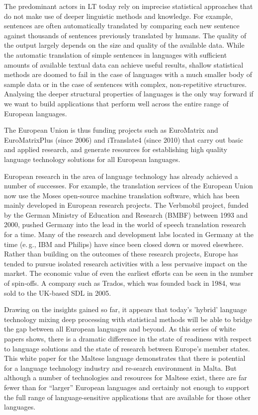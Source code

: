 \documentclass[]{../../metanetpaper}
\begin{document}
\begin{multicols}{2}
The predominant actors in LT today rely on imprecise statistical approaches that do not make use of deeper linguistic methods and knowledge. For example, sentences are often automatically translated by comparing each new sentence against thousands of sentences previously translated by humans. The quality of the output largely depends on the size and quality of the available  data. While the automatic translation of simple sentences in languages with sufficient amounts of available textual data can achieve useful results, shallow statistical methods are doomed to fail in the case of languages with a much smaller body of sample data or in the case of sentences with complex, non-repetitive structures. Analysing the deeper structural properties of languages is the only way forward if we want to build applications that perform well across the entire range of European languages.


The European Union is thus funding projects such as EuroMatrix and EuroMatrixPlus (since 2006) and iTranslate4 (since 2010) that carry out basic and applied research, and generate resources for establishing high quality language technology solutions for all European languages. 

European research in the area of language technology has already achieved a number of successes. For example, the translation services of the European Union now use the Moses open-source machine translation software, which has been mainly developed in European research projects. The Verbmobil project, funded by the German Ministry of Education and Research (BMBF) between 1993 and 2000, pushed Germany into the lead in the world of speech translation research for a time. Many of the research and development labs located in Germany at the time (e.\,g., IBM and Philips) have since been closed down or moved elsewhere. Rather than building on the outcomes of these research projects, Europe has tended to pursue isolated research activities with a less pervasive impact on the market. The economic value of even the earliest efforts can be seen in the number of spin-offs. A company such as Trados, which was founded back in 1984, was sold to the UK-based SDL in 2005.


Drawing on the insights gained so far, it appears that today’s 'hybrid' language technology mixing deep processing with statistical methods will be able to bridge the gap between all European languages and beyond. As this series of white papers shows, there is a dramatic difference in the state of readiness with respect to language solutions and the state of research between Europe’s member states. This white paper for the Maltese language demonstrates that there is potential for a language technology industry and re-search environment in Malta. But although a number of technologies and resources for Maltese exist, there are far fewer than for “larger” European languages and certainly not enough to support the full range of language-sensitive applications that are available for those other languages.


\end{multicols}
\end{document}
